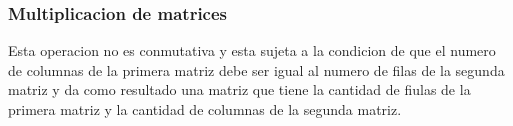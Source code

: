 \subsubsection*{Multiplicacion de matrices} \label{Multiplicaciondematrices}

Esta operacion no es conmutativa y esta sujeta a la condicion de que el
numero de columnas de la primera matriz debe ser igual al numero de filas de la
segunda matriz y da como resultado una matriz que tiene la cantidad de fiulas de
la primera matriz y la cantidad de columnas de la segunda matriz.











